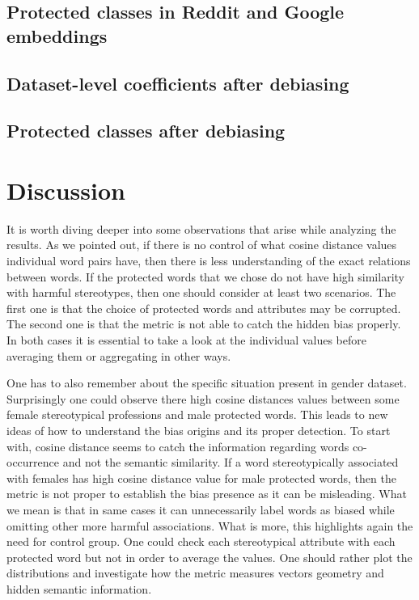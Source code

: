 \documentclass[
  12pt,
]{book}
\begin{document}
\hypertarget{protected-classes-in-reddit-and-google-embeddings}{%
\section{Protected classes in Reddit and Google embeddings}\label{protected-classes-in-reddit-and-google-embeddings}}

\hypertarget{dataset-level-coefficients-after-debiasing}{%
\section{Dataset-level coefficients after debiasing}\label{dataset-level-coefficients-after-debiasing}}

\hypertarget{protected-classes-after-debiasing}{%
\section{Protected classes after debiasing}\label{protected-classes-after-debiasing}}

\hypertarget{discussion}{%
\chapter{Discussion}\label{discussion}}

It is worth diving deeper into some observations that arise while analyzing the results.
As we pointed out, if there is no control of what cosine distance values individual word pairs have, then there is less
understanding of the exact relations between words. If the protected words that we chose do not have high similarity with harmful stereotypes, then one should consider at least two scenarios. The first one is that the choice of protected words and attributes may be corrupted. The second one is that the metric is not able to catch the hidden bias properly. In both cases it is essential to take a look at the individual values before averaging them or aggregating in other ways.

One has to also remember about the specific situation present in gender dataset. Surprisingly one could observe there high cosine distances values between some female stereotypical professions and male protected words. This leads to new ideas of how to understand the bias origins and its proper detection. To start with, cosine distance seems to catch the information regarding words co-occurrence and not the semantic similarity. If a word stereotypically associated with females has high cosine distance value for male protected words, then the metric is not proper to establish the bias presence as it can be misleading. What we mean is that in same cases it can unnecessarily label words as biased while omitting other more harmful associations. What is more, this highlights again the need for control group. One could check each stereotypical attribute with each protected word but not in order to average the values. One should rather plot the distributions and investigate how the metric measures vectors geometry and hidden semantic information.
\end{document}
